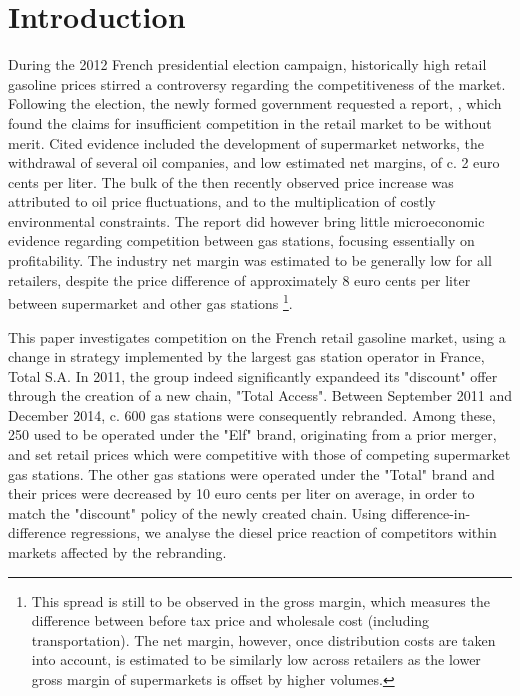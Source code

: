 \documentclass[english]{article}
\begin{document}
\newpage{}


\section{Introduction}

During the 2012 French presidential election campaign, historically high retail gasoline prices stirred a controversy regarding the competitiveness of the market. Following the election, the newly formed government requested a report, \cite{BEL12}, which found the claims for insufficient competition in the retail market to be without merit. Cited evidence included the development of supermarket networks, the withdrawal of several oil companies, and low estimated net margins, of c. 2 euro cents per liter. The bulk of the then recently observed price increase was attributed to oil price fluctuations, and to the multiplication of costly environmental constraints. The report did however bring little microeconomic evidence regarding competition between gas stations, focusing essentially on profitability. The industry net margin was estimated to be generally low for all retailers, despite the price difference of approximately 8 euro cents per liter between supermarket and other gas stations%
\footnote{This spread is still to be observed in the gross margin, which measures the difference between before tax price and wholesale cost (including transportation). The net margin, however, once distribution costs are taken into account, is estimated to be similarly low across retailers as the lower gross margin of supermarkets is offset by higher volumes.}.

This paper investigates competition on the French retail gasoline market, using a change in strategy implemented by the largest gas station operator in France, Total S.A. In 2011, the group indeed significantly expandeed its "discount" offer through the creation of a new chain, "Total Access". Between September 2011 and December 2014, c. 600 gas stations were consequently rebranded. Among these, 250 used to be operated under the "Elf" brand, originating from a prior merger, and set retail prices which were competitive with those of competing supermarket gas stations. The other gas stations were operated under the "Total" brand and their prices were decreased by 10 euro cents per liter on average, in order to match the "discount" policy of the newly created chain. Using difference-in-difference regressions, we analyse the diesel price reaction of competitors within markets affected by the rebranding.
\end{document}

